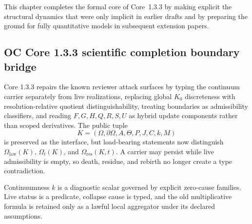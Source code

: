 This chapter completes the formal core of Core~1.3.3 by making explicit the
structural dynamics that were only implicit in earlier drafts and by preparing
the ground for fully quantitative models in subsequent extension papers.


\subsection{OC Core 1.3.3 scientific completion boundary bridge}
\label{sec:oc133-scientific-closure-bridge}

Core 1.3.3 repairs the known reviewer attack surfaces by typing the continuum
carrier separately from live realizations, replacing global \(K_0\)
discreteness with resolution-relative quotient distinguishability, treating
boundaries as admissibility classifiers, and reading \(F,G,H,Q,R,S,U\) as
hybrid update components rather than scoped derivatives.  The public tuple
\[
K=(\Omega,\partial\Omega,A,\Theta,P,J,C,k,M)
\]
is preserved as the interface, but load-bearing statements now distinguish
\(\Omega_{\mathrm{law}}(K)\), \(\Omega_t(K)\), and
\(\Omega_{\mathrm{res}}(K,t)\).  A carrier may persist while live admissibility
is empty, so death, residue, and rebirth no longer create a type contradiction.

Continuumness \(k\) is a diagnostic scalar governed by explicit zero-cause
families.  Live status is a predicate, collapse cause is typed, and the old
multiplicative formula is retained only as a lawful local aggregator under its
declared assumptions.
